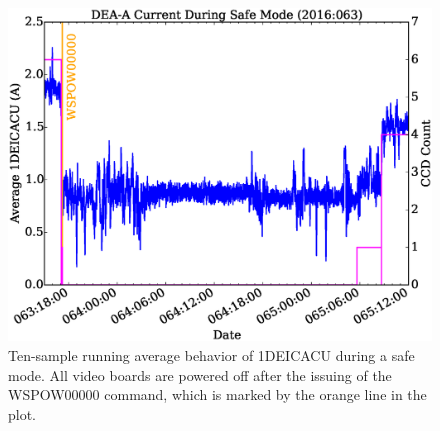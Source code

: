 \documentclass[11pt]{article}
\begin{document}
\begin{landscape}
\begin{figure}
\begin{center}
\includegraphics[width=1.2\textwidth]{deaa_on_fig2.eps}
\caption{Ten-sample running average behavior of 1DEICACU during a safe mode. All video boards
are powered off after the issuing of the WSPOW00000 command, which is marked by
the orange line in the plot.}
\end{center}
\end{figure}
\end{landscape}

\newcommand{\tablecaptiontext}{TURN ON DEA A}

\end{document}
